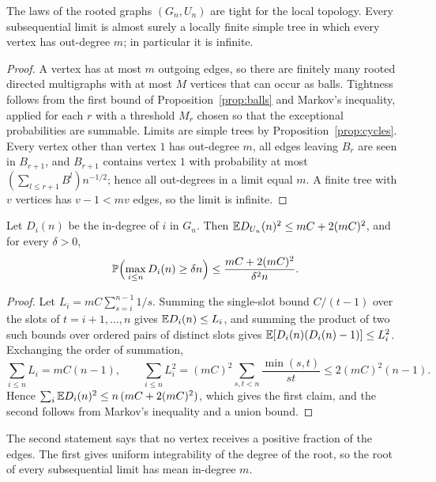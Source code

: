 \begin{corollary}\label{cor:tight}
The laws of the rooted graphs $(G_n,U_n)$ are tight for the local topology. Every subsequential limit is almost
surely a locally finite simple tree in which every vertex has out-degree $m$; in particular it is infinite.
\end{corollary}

\begin{proof}
A vertex has at most $m$ outgoing edges, so there are finitely many rooted directed multigraphs with at most $M$
vertices that can occur as balls. Tightness follows from the first bound of Proposition~\ref{prop:balls} and
Markov's inequality, applied for each $r$ with a threshold $M_r$ chosen so that the exceptional probabilities are
summable. Limits are simple trees by Proposition~\ref{prop:cycles}. Every vertex other than vertex $1$ has
out-degree $m$, all edges leaving $B_r$ are seen in $B_{r+1}$, and $B_{r+1}$ contains vertex $1$ with probability
at most $(\sum_{l\le r+1}B^l)n^{-1/2}$; hence all out-degrees in a limit equal $m$. A finite tree with $v$
vertices has $v-1<mv$ edges, so the limit is infinite.
\end{proof}

\begin{lemma}[Degrees]\label{lem:degrees}
Let $D_i(n)$ be the in-degree of $i$ in $G_n$. Then $\mathbb{E} D_{U_n}(n)^2\le mC+2(mC)^2$, and for every $\delta>0$,
\[
   \mathbb{P}\Bigl(\max_{i\le n}D_i(n)\ge\delta n\Bigr)\le\frac{mC+2(mC)^2}{\delta^2n}.
\]
\end{lemma}

\begin{proof}
Let $L_i=mC\sum_{s=i}^{n-1}1/s$. Summing the single-slot bound $C/(t-1)$ over the slots of $t=i+1,\dots,n$ gives
$\mathbb{E} D_i(n)\le L_i$, and summing the product of two such bounds over ordered pairs of distinct slots gives
$\mathbb{E}[D_i(n)(D_i(n)-1)]\le L_i^2$. Exchanging the order of summation,
\[
  \sum_{i\le n}L_i=mC(n-1),\qquad \sum_{i\le n}L_i^2=(mC)^2\sum_{s,t<n}\frac{\min(s,t)}{st}\le 2(mC)^2(n-1).
\]
Hence $\sum_i\mathbb{E} D_i(n)^2\le n\,(mC+2(mC)^2)$, which gives the first claim, and the second follows from Markov's
inequality and a union bound.
\end{proof}

The second statement says that no vertex receives a positive fraction of the edges. The first gives uniform
integrability of the degree of the root, so the root of every subsequential limit has mean in-degree $m$.
